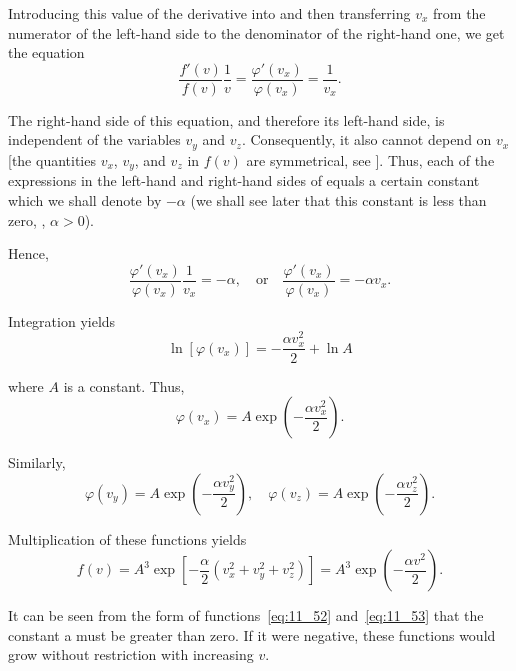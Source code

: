\noindent
Introducing this value of the derivative into  and then transferring $v_x$ from the numerator of the left-hand side to the denominator of the right-hand one, we get the equation
\begin{equation}\label{eq:11_51}
	\frac{f'(v)}{f(v)}\frac{1}{v} = \frac{\varphi'(v_x)}{\varphi(v_x)} = \frac{1}{v_x}.
\end{equation}

\noindent
The right-hand side of this equation, and therefore its left-hand side, is independent of the variables $v_y$ and $v_z$. Consequently, it also cannot depend on $v_x$ [the quantities $v_x$, $v_y$, and $v_z$ in $f(v)$ are symmetrical, see ]. Thus, each of the expressions in the left-hand and right-hand sides of  equals a certain constant which we shall denote by $-\alpha$ (we shall see later that this constant is less than zero, \ie, $\alpha>0$).

Hence,
\begin{equation*}
	\frac{\varphi'(v_x)}{\varphi(v_x)}\frac{1}{v_x} = -\alpha,\quad \text{or}\quad \frac{\varphi'(v_x)}{\varphi(v_x)} = -\alpha v_x.
\end{equation*}

\noindent
Integration yields
\begin{equation*}
	\ln[\varphi(v_x)] = -\frac{\alpha v_x^2}{2} + \ln{A}
\end{equation*}

\noindent
where $A$ is a constant. Thus,
\begin{equation}\label{eq:11_52}
	\varphi(v_x) = A \exp\left(-\frac{\alpha v_x^2}{2}\right).
\end{equation}

\noindent
Similarly,
\begin{equation*}
	\varphi(v_y) = A \exp\left(-\frac{\alpha v_y^2}{2}\right),\quad \varphi(v_z) = A \exp\left(-\frac{\alpha v_z^2}{2}\right).
\end{equation*}

\noindent
Multiplication of these functions yields
\begin{equation}\label{eq:11_53}
	f(v) = A^3 \exp\left[-\frac{\alpha}{2}\left(v_x^2+v_y^2+v_z^2\right)\right] = A^3 \exp\left(-\frac{\alpha v^2}{2}\right).
\end{equation}

It can be seen from the form of functions~\eqref{eq:11_52} and~\eqref{eq:11_53} that the constant a must be greater than zero. If it were negative, these functions would grow without restriction with increasing $v$.

